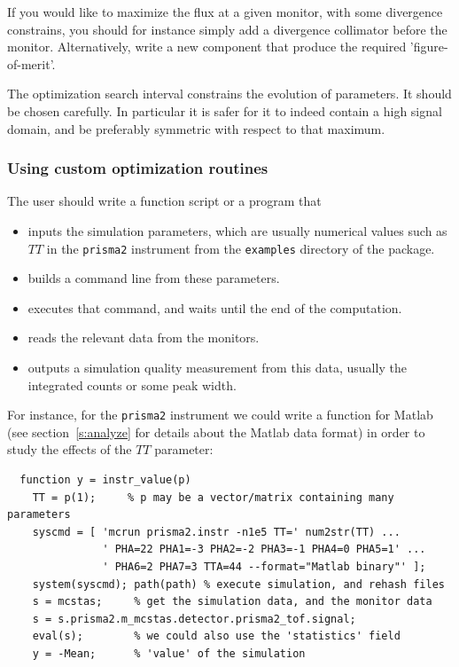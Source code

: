 If you would like to maximize the flux at a given monitor, with some
divergence constrains, you should for instance simply add a divergence
collimator before the monitor. Alternatively, write a new component
that produce the required 'figure-of-merit'.

The optimization search interval constrains the evolution of
parameters. It should be chosen carefully. In particular it is safer
for it to indeed contain a high signal domain, and be preferably
symmetric with respect to that maximum.

\subsubsection{Using custom optimization routines}
The user should write a function script or a program that
\begin{itemize}
\item inputs the simulation parameters, which are usually numerical values such
  as $TT$ in the \verb+prisma2+ instrument from the \verb+examples+ directory of
  the package.
\item builds a command line from these parameters.
\item executes that command, and waits until the end of the computation.
\item reads the relevant data from the monitors.
\item outputs a simulation quality measurement from this data, usually the
  integrated counts or some peak width.
\end{itemize}

For instance, for the \verb+prisma2+ instrument we could write a function for
Matlab (see section~\ref{s:analyze} for details about the Matlab data format) in
order to study the effects of the $TT$ parameter:
\begin{verbatim}
  function y = instr_value(p)
    TT = p(1);     % p may be a vector/matrix containing many parameters
    syscmd = [ 'mcrun prisma2.instr -n1e5 TT=' num2str(TT) ...
               ' PHA=22 PHA1=-3 PHA2=-2 PHA3=-1 PHA4=0 PHA5=1' ...
               ' PHA6=2 PHA7=3 TTA=44 --format="Matlab binary"' ];
    system(syscmd); path(path) % execute simulation, and rehash files
    s = mcstas;     % get the simulation data, and the monitor data
    s = s.prisma2.m_mcstas.detector.prisma2_tof.signal;
    eval(s);        % we could also use the 'statistics' field
    y = -Mean;      % 'value' of the simulation
\end{verbatim}

